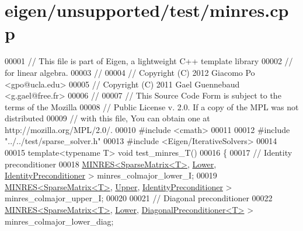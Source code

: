 \hypertarget{eigen_2unsupported_2test_2minres_8cpp_source}{}\section{eigen/unsupported/test/minres.cpp}
\label{eigen_2unsupported_2test_2minres_8cpp_source}

\begin{DoxyCode}
00001 \textcolor{comment}{// This file is part of Eigen, a lightweight C++ template library}
00002 \textcolor{comment}{// for linear algebra.}
00003 \textcolor{comment}{//}
00004 \textcolor{comment}{// Copyright (C) 2012 Giacomo Po <gpo@ucla.edu>}
00005 \textcolor{comment}{// Copyright (C) 2011 Gael Guennebaud <g.gael@free.fr>}
00006 \textcolor{comment}{//}
00007 \textcolor{comment}{// This Source Code Form is subject to the terms of the Mozilla}
00008 \textcolor{comment}{// Public License v. 2.0. If a copy of the MPL was not distributed}
00009 \textcolor{comment}{// with this file, You can obtain one at http://mozilla.org/MPL/2.0/.}
00010 \textcolor{preprocessor}{#include <cmath>}
00011 
00012 \textcolor{preprocessor}{#include "../../test/sparse\_solver.h"}
00013 \textcolor{preprocessor}{#include <Eigen/IterativeSolvers>}
00014 
00015 \textcolor{keyword}{template}<\textcolor{keyword}{typename} T> \textcolor{keywordtype}{void} test\_minres\_T()
00016 \{
00017   \textcolor{comment}{// Identity preconditioner}
00018   \hyperlink{group___iterative_linear_solvers___module_class_eigen_1_1_m_i_n_r_e_s}{MINRES<SparseMatrix<T>}, \hyperlink{group__enums_gga39e3366ff5554d731e7dc8bb642f83cda891792b8ed394f7607ab16dd716f60e6}{Lower}, 
      \hyperlink{group___iterative_linear_solvers___module_class_eigen_1_1_identity_preconditioner}{IdentityPreconditioner}    > minres\_colmajor\_lower\_I;
00019   \hyperlink{group___iterative_linear_solvers___module_class_eigen_1_1_m_i_n_r_e_s}{MINRES<SparseMatrix<T>}, \hyperlink{group__enums_gga39e3366ff5554d731e7dc8bb642f83cda6bcb58be3b8b8ec84859ce0c5ac0aaec}{Upper}, 
      \hyperlink{group___iterative_linear_solvers___module_class_eigen_1_1_identity_preconditioner}{IdentityPreconditioner}    > minres\_colmajor\_upper\_I;
00020 
00021   \textcolor{comment}{// Diagonal preconditioner}
00022   \hyperlink{group___iterative_linear_solvers___module_class_eigen_1_1_m_i_n_r_e_s}{MINRES<SparseMatrix<T>}, \hyperlink{group__enums_gga39e3366ff5554d731e7dc8bb642f83cda891792b8ed394f7607ab16dd716f60e6}{Lower}, 
      \hyperlink{group___iterative_linear_solvers___module_class_eigen_1_1_diagonal_preconditioner}{DiagonalPreconditioner<T>} > minres\_colmajor\_lower\_diag;

\end{DoxyCode}
